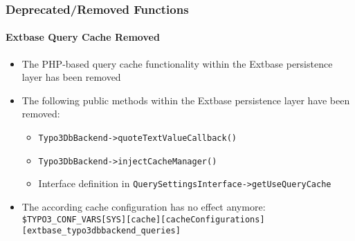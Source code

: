 \begin{frame}[fragile]
	\frametitle{Deprecated/Removed Functions}
	\framesubtitle{Extbase Query Cache Removed}

	\begin{itemize}

		\item The PHP-based query cache functionality within the Extbase persistence layer has been removed

		\item The following public methods within the Extbase persistence layer have been removed:

			\begin{itemize}
				\item \small\texttt{Typo3DbBackend->quoteTextValueCallback()}\normalsize
				\item \small\texttt{Typo3DbBackend->injectCacheManager()}\normalsize
				\item Interface definition in \small\texttt{QuerySettingsInterface->getUseQueryCache}\normalsize
			\end{itemize}

		\item The according cache configuration has no effect anymore:\newline
			\smaller
				\texttt{\$TYPO3\_CONF\_VARS[SYS][cache][cacheConfigurations]}\newline
				\tabto{0.4cm}\texttt{[extbase\_typo3dbbackend\_queries]}
			\normalsize

	\end{itemize}

\end{frame}


